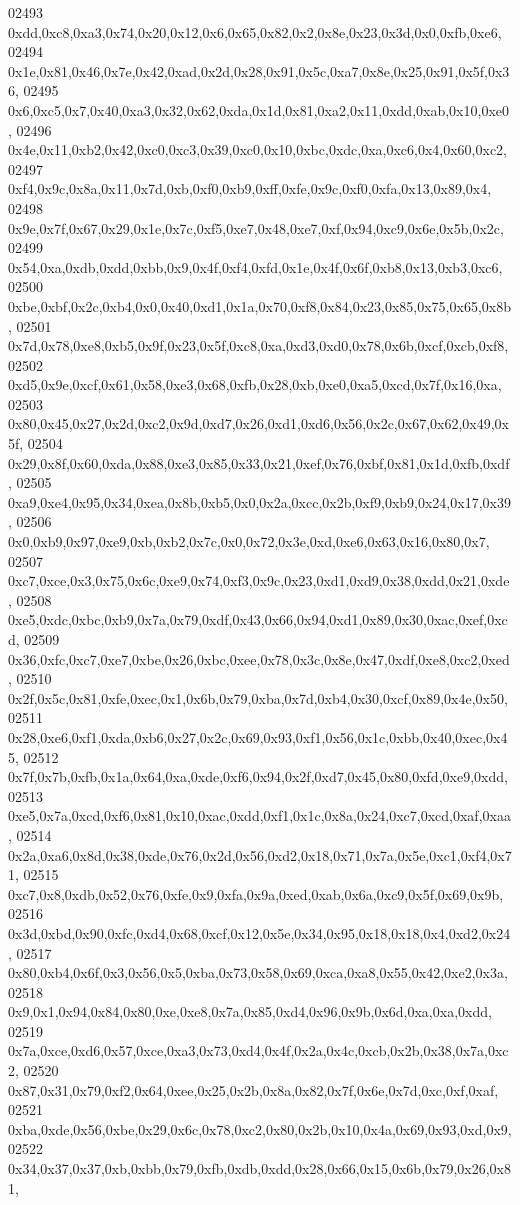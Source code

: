 \begin{DoxyCode}
02493   0xdd,0xc8,0xa3,0x74,0x20,0x12,0x6,0x65,0x82,0x2,0x8e,0x23,0x3d,0x0,0xfb,0xe6,
02494   0x1e,0x81,0x46,0x7e,0x42,0xad,0x2d,0x28,0x91,0x5c,0xa7,0x8e,0x25,0x91,0x5f,0x36,
02495   0x6,0xc5,0x7,0x40,0xa3,0x32,0x62,0xda,0x1d,0x81,0xa2,0x11,0xdd,0xab,0x10,0xe0,
02496   0x4e,0x11,0xb2,0x42,0xc0,0xc3,0x39,0xc0,0x10,0xbc,0xdc,0xa,0xc6,0x4,0x60,0xc2,
02497   0xf4,0x9c,0x8a,0x11,0x7d,0xb,0xf0,0xb9,0xff,0xfe,0x9c,0xf0,0xfa,0x13,0x89,0x4,
02498   0x9e,0x7f,0x67,0x29,0x1e,0x7c,0xf5,0xe7,0x48,0xe7,0xf,0x94,0xc9,0x6e,0x5b,0x2c,
02499   0x54,0xa,0xdb,0xdd,0xbb,0x9,0x4f,0xf4,0xfd,0x1e,0x4f,0x6f,0xb8,0x13,0xb3,0xc6,
02500   0xbe,0xbf,0x2c,0xb4,0x0,0x40,0xd1,0x1a,0x70,0xf8,0x84,0x23,0x85,0x75,0x65,0x8b,
02501   0x7d,0x78,0xe8,0xb5,0x9f,0x23,0x5f,0xc8,0xa,0xd3,0xd0,0x78,0x6b,0xcf,0xcb,0xf8,
02502   0xd5,0x9e,0xcf,0x61,0x58,0xe3,0x68,0xfb,0x28,0xb,0xe0,0xa5,0xcd,0x7f,0x16,0xa,
02503   0x80,0x45,0x27,0x2d,0xc2,0x9d,0xd7,0x26,0xd1,0xd6,0x56,0x2c,0x67,0x62,0x49,0x5f,
02504   0x29,0x8f,0x60,0xda,0x88,0xe3,0x85,0x33,0x21,0xef,0x76,0xbf,0x81,0x1d,0xfb,0xdf,
02505   0xa9,0xe4,0x95,0x34,0xea,0x8b,0xb5,0x0,0x2a,0xcc,0x2b,0xf9,0xb9,0x24,0x17,0x39,
02506   0x0,0xb9,0x97,0xe9,0xb,0xb2,0x7c,0x0,0x72,0x3e,0xd,0xe6,0x63,0x16,0x80,0x7,
02507   0xc7,0xce,0x3,0x75,0x6c,0xe9,0x74,0xf3,0x9c,0x23,0xd1,0xd9,0x38,0xdd,0x21,0xde,
02508   0xe5,0xdc,0xbc,0xb9,0x7a,0x79,0xdf,0x43,0x66,0x94,0xd1,0x89,0x30,0xac,0xef,0xcd,
02509   0x36,0xfc,0xc7,0xe7,0xbe,0x26,0xbc,0xee,0x78,0x3c,0x8e,0x47,0xdf,0xe8,0xc2,0xed,
02510   0x2f,0x5c,0x81,0xfe,0xec,0x1,0x6b,0x79,0xba,0x7d,0xb4,0x30,0xcf,0x89,0x4e,0x50,
02511   0x28,0xe6,0xf1,0xda,0xb6,0x27,0x2c,0x69,0x93,0xf1,0x56,0x1c,0xbb,0x40,0xec,0x45,
02512   0x7f,0x7b,0xfb,0x1a,0x64,0xa,0xde,0xf6,0x94,0x2f,0xd7,0x45,0x80,0xfd,0xe9,0xdd,
02513   0xe5,0x7a,0xcd,0xf6,0x81,0x10,0xac,0xdd,0xf1,0x1c,0x8a,0x24,0xc7,0xcd,0xaf,0xaa,
02514   0x2a,0xa6,0x8d,0x38,0xde,0x76,0x2d,0x56,0xd2,0x18,0x71,0x7a,0x5e,0xc1,0xf4,0x71,
02515   0xc7,0x8,0xdb,0x52,0x76,0xfe,0x9,0xfa,0x9a,0xed,0xab,0x6a,0xc9,0x5f,0x69,0x9b,
02516   0x3d,0xbd,0x90,0xfc,0xd4,0x68,0xcf,0x12,0x5e,0x34,0x95,0x18,0x18,0x4,0xd2,0x24,
02517   0x80,0xb4,0x6f,0x3,0x56,0x5,0xba,0x73,0x58,0x69,0xca,0xa8,0x55,0x42,0xe2,0x3a,
02518   0x9,0x1,0x94,0x84,0x80,0xe,0xe8,0x7a,0x85,0xd4,0x96,0x9b,0x6d,0xa,0xa,0xdd,
02519   0x7a,0xce,0xd6,0x57,0xce,0xa3,0x73,0xd4,0x4f,0x2a,0x4c,0xcb,0x2b,0x38,0x7a,0xc2,
02520   0x87,0x31,0x79,0xf2,0x64,0xee,0x25,0x2b,0x8a,0x82,0x7f,0x6e,0x7d,0xc,0xf,0xaf,
02521   0xba,0xde,0x56,0xbe,0x29,0x6c,0x78,0xc2,0x80,0x2b,0x10,0x4a,0x69,0x93,0xd,0x9,
02522   0x34,0x37,0x37,0xb,0xbb,0x79,0xfb,0xdb,0xdd,0x28,0x66,0x15,0x6b,0x79,0x26,0x81,

\end{DoxyCode}
